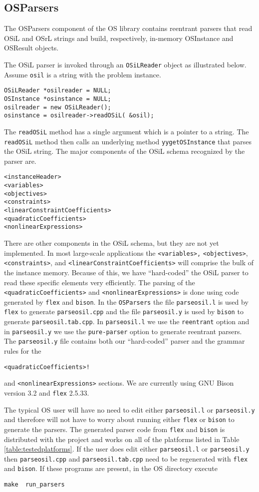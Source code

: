 \documentclass[11pt]{article}
\renewcommand{\_}{{\char"5F}}
\renewcommand{\{}{{\char"7B}}
\renewcommand{\}}{{\char"7D}}
\renewcommand{\^}{{\char"0D}}
\renewcommand{\'}{{\char"0D}}
\begin{document}
\subsection{OSParsers}\label{section:osparsers}

The OSParsers component of the OS library contains reentrant parsers that  read OSiL and OSrL strings and build, respectively, in-memory OSInstance and OSResult  objects.


The OSiL parser is invoked through an {\tt OSiLReader} object as illustrated below. Assume {\tt osil} is a string with the problem instance.
\begin{verbatim}
OSiLReader *osilreader = NULL;
OSInstance *osinstance = NULL;
osilreader = new OSiLReader();
osinstance = osilreader->readOSiL( &osil);
\end{verbatim}
The {\tt  readOSiL} method  has a single argument which is a pointer to a string. The {\tt  readOSiL} method then calls an underlying method {\tt yygetOSInstance} that parses the OSiL string. The major components of the OSiL schema  recognized by the parser are.
\begin{verbatim}
<instanceHeader>
<variables>
<objectives>
<constraints>
<linearConstraintCoefficients>
<quadraticCoefficients>
<nonlinearExpressions>
\end{verbatim}
There are other components in the OSiL schema, but they are not yet implemented. In most large-scale applications the {\tt <variables>,} {\tt <objectives>}, {\tt <constraints>}, and {\tt <linearConstraintCoefficients>}  will comprise the bulk of the instance memory.  Because of this, we have ``hard-coded'' the OSiL parser to read these specific elements very efficiently. The parsing of the {\tt <quadraticCoefficients>} and {\tt <nonlinearExpressions>} is done using code generated by {\tt flex} and {\tt bison}. In the {\tt OSParsers}  the file  {\tt parseosil.l} is used by {\tt flex} to generate {\tt parseosil.cpp} and the file {\tt parseosil.y} is used by {\tt bison} to generate {\tt parseosil.tab.cpp}.  In {\tt parseosil.l} we use the {\tt reentrant} option and in {\tt parseosil.y} we use the {\tt pure-parser} option to generate reentrant parsers. The {\tt parseosil.y} file  contains both our  ``hard-coded'' parser and the grammar rules for the  {\tt <quadraticCoefficients>!
 
 } and {\tt <nonlinearExpressions>} sections.   We are currently using GNU Bison version 3.2 and {\tt flex} 2.5.33.

The typical OS user will have no need to edit either {\tt parseosil.l} or {\tt parseosil.y} and therefore will not have to worry about running either {\tt flex} or {\tt bison} to generate the parsers. The generated parser code from {\tt flex} and {\tt bison} is distributed with the project and works on all of the platforms listed in Table \ref{table:testedplatforms}.  If the user does edit either {\tt parseosil.l} or {\tt parseosil.y} then {\tt parseosil.cpp} and {\tt parseosil.tab.cpp} need to be regenerated with {\tt flex} and {\tt bison}. If these programs are present, in the OS directory  execute
\begin{verbatim}
make  run_parsers
\end{verbatim}
\end{document}

